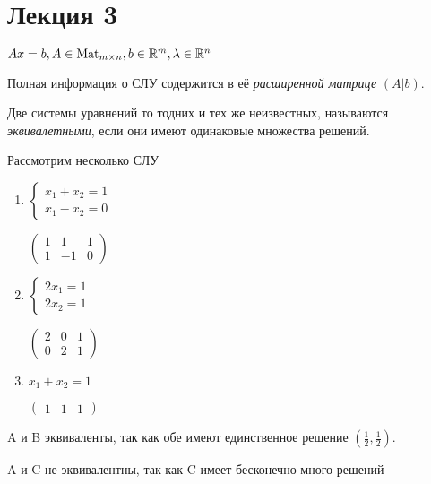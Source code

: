 \section{Лекция 3}

$Ax = b, A \in \text{Mat}_{m \times n}, b \in \mathbb{R}^m, \lambda \in \mathbb{R}^n$

Полная информация о СЛУ содержится в её \textit{расширенной матрице} $(A | b)$.

\begin{definition}
    Две системы уравнений то тодних и тех же неизвестных, называются \textit{эквивалетными}, если они имеют одинаковые множества решений.
\end{definition}

\begin{example}
    Рассмотрим несколько СЛУ

    \begin{enumerate}
    \item
        $\begin{cases}
            x_1 + x_2 = 1 \\
            x_1 - x_2 = 0
        \end{cases}$

        $\begin{pmatrix}
            1 & 1 & 1 \\
            1 & -1 & 0
        \end{pmatrix}$

    \item
        $\begin{cases}
            2x_1 = 1 \\
            2x_2 = 1
        \end{cases}$

        $\begin{pmatrix}
            2 & 0 & 1 \\
            0 & 2 & 1
        \end{pmatrix}$

    \item
        $x_1 + x_2 = 1$
        
        $\begin{pmatrix} 1 & 1 & 1 \end{pmatrix}$
    \end{enumerate}

    A и B эквиваленты, так как обе имеют единственное решение $(\frac{1}{2}, \frac{1}{2})$.
    
    A и C не эквивалентны, так как C имеет бесконечно много решений
\end{example}

